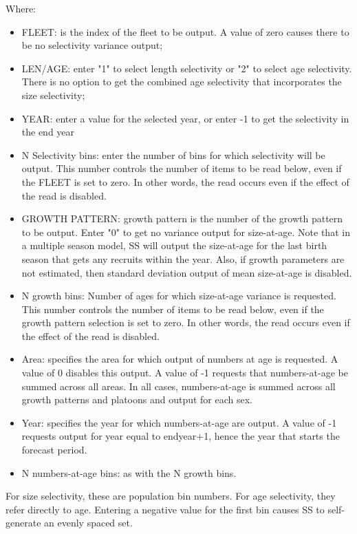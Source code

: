 Where:
\begin{itemize}
	\item FLEET:  is the index of the fleet to be output.  A value of zero causes there to be no selectivity variance output;
	\item LEN/AGE:  enter "1" to select length selectivity or "2" to select age selectivity.  There is no option to get the combined age selectivity that incorporates the size selectivity;
	\item YEAR:  enter a value for the selected year, or enter -1 to get the selectivity in the end year
	\item 	N Selectivity bins:  enter the number of bins for which selectivity will be output.  This number controls the number of items to be read below, even if the FLEET is set to zero.  In other words, the read occurs even if the effect of the read is disabled.
	\item GROWTH PATTERN:  growth pattern is the number of the growth pattern to be output.  Enter "0" to get no variance output for size-at-age.   Note that in a multiple season model, SS will output the size-at-age for the last birth season that gets any recruits within the year.  Also, if growth parameters are not estimated, then standard deviation output of mean size-at-age is disabled.
	\item 	N growth bins:  Number of ages for which size-at-age variance is requested.  This number controls the number of items to be read below, even if the growth pattern selection is set to zero.   In other words, the read occurs even if the effect of the read is disabled.
	\item 	Area:  specifies the area for which output of numbers at age is requested.  A value of 0 disables this output.  A value of -1 requests that numbers-at-age be summed across all areas.  In all cases, numbers-at-age is summed across all growth patterns and platoons and output for each sex.
	\item 	Year:  specifies the year for which numbers-at-age are output.  A value of -1 requests output for year equal to endyear+1, hence the year that starts the forecast period.
	\item N numbers-at-age bins:  as with the N growth bins.
\end{itemize}
For size selectivity, these are population bin numbers.  For age selectivity, they refer directly to age.  Entering a negative value for the first bin causes SS to self-generate an evenly spaced set.


